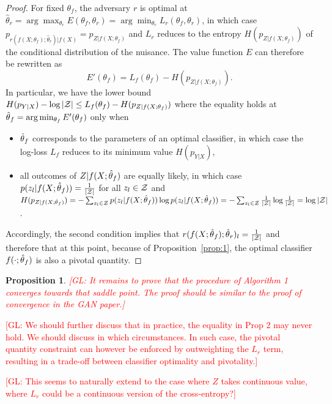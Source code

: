 \documentclass{article}
\newcommand{\glnote}[1]{\textcolor{red}{[GL: #1]}}
\theoremstyle{plain}
\newtheorem{proposition}[theorem]{Proposition}
\begin{document}
\begin{proof}
For fixed $\theta_f$, the adversary $r$ is optimal at $\hat\theta_r = \arg
\max_{\theta_r} E(\theta_f, \theta_r)  = \arg \min_{\theta_r} L_r(\theta_f,
\theta_r)$, in which case $p_{r(f(X;\theta_f);\hat\theta_r)|f(X)} = p_{Z|f(X;\theta_f)}$ and $L_r$ reduces to the entropy
$H(p_{Z|f(X;\theta_f)})$ of the conditional distribution of the nuisance. The
value function $E$ can therefore be rewritten as $$E'(\theta_f) = L_f(\theta_f) -
H(p_{Z|f(X;\theta_f)}).$$  In particular, we have the lower bound $H(p_{Y|X}) -
\log |{\cal Z}| \leq L_f(\theta_f) - H(p_{Z|f(X;\theta_f)})$ where the equality
holds at $\smash{\hat\theta}_f = \arg \min_{\theta_f} E'(\theta_f)$ only when
\begin{itemize}
    \item $\smash{\hat\theta}_f$ corresponds to
    the parameters of an optimal classifier, in which case the log-loss $L_f$
    reduces to its minimum value $H(p_{Y|X})$,
    \item all
   outcomes of $Z|f(X;\smash{\hat\theta}_f)$ are equally likely, in which case
   $p(z_l|f(X;\smash{\hat\theta}_f)) = \frac{1}{|{\cal Z}|}$ for all $z_l \in {\cal
   Z}$ and $H(p_{Z|f(X;\smash{\hat\theta}_f)}) =
   -\sum_{z_l \in {\cal Z}} p(z_l|f(X;\smash{\hat\theta}_f)) \log  p(z_l|f(X;\smash{\hat\theta}_f)) =  -\sum_{z_l \in {\cal Z}} \frac{1}{|{\cal Z}|} \log \frac{1}{|{\cal Z}|} = \log |{\cal Z}|$.
\end{itemize}
Accordingly, the second condition implies that $r(f(X;\smash{\hat\theta}_f) ;
\smash{\hat\theta}_r )_l = \frac{1}{|{\cal Z}|}$ and therefore that at this
point, because of Proposition~\ref{prop:1}, the optimal classifier $f(\cdot;\smash{\hat\theta}_f)$ is also a pivotal quantity.
\end{proof}

\begin{proposition}
    \glnote{It remains to prove that the procedure of Algorithm 1
    converges towards that saddle point. The proof should be similar to the proof of convergence in the GAN paper.}
\end{proposition}

\glnote{We should further discuss that in practice, the equality in Prop 2 may never hold.
We should discuss in which circumstances. In such case, the pivotal quantity
constraint can however be enforced by outweighting the $L_r$ term, resulting in a
trade-off between classifier optimality and pivotality.}

\glnote{This seems to naturally extend to the case where $Z$ takes continuous
value, where $L_r$ could be a continuous version of the cross-entropy?}
\end{document}
